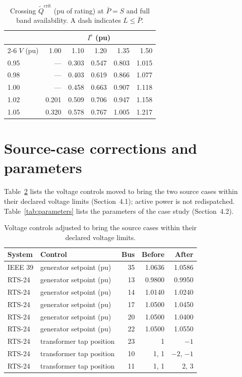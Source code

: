 \documentclass[11pt,a4paper]{article}
\begin{document}
\begin{table}[h]
  \caption{Crossing $\tilde{Q}^{\mathrm{crit}}$ (pu of rating) at
  $\bar{P} = S$ and full band availability. A dash indicates
  $L \le \bar{P}$.}
  \label{tab:critical}
  \centering
  \begin{tabular}{@{}l rrrrr@{}}
    \toprule
    & \multicolumn{5}{c}{$I^{\mathrm{s}}$ (pu)} \\
    \cmidrule(l){2-6}
    $V$ (pu) & 1.00 & 1.10 & 1.20 & 1.35 & 1.50 \\
    \midrule
    0.95 & --- & 0.303 & 0.547 & 0.803 & 1.015 \\
    0.98 & --- & 0.403 & 0.619 & 0.866 & 1.077 \\
    1.00 & --- & 0.458 & 0.663 & 0.907 & 1.118 \\
    1.02 & 0.201 & 0.509 & 0.706 & 0.947 & 1.158 \\
    1.05 & 0.320 & 0.578 & 0.767 & 1.005 & 1.217 \\
    \bottomrule
  \end{tabular}
\end{table}

\section{Source-case corrections and parameters}
\label{s:setup}

Table~\ref{tab:repair} lists the voltage controls moved to bring the two
source cases within their declared voltage limits (Section~4.1); active power
is not redispatched. Table~\ref{tab:parameters} lists the parameters of the
case study (Section~4.2).

\begin{table}[h]
  \caption{Voltage controls adjusted to bring the source cases within their
  declared voltage limits.}
  \label{tab:repair}
  \centering
  \begin{tabular}{@{}llrrr@{}}
    \toprule
    System & Control & Bus & Before & After \\
    \midrule
    IEEE 39 & generator setpoint (pu) & 35 & 1.0636 & 1.0586 \\
    RTS-24 & generator setpoint (pu) & 13 & 0.9800 & 0.9950 \\
    RTS-24 & generator setpoint (pu) & 14 & 1.0140 & 1.0240 \\
    RTS-24 & generator setpoint (pu) & 17 & 1.0500 & 1.0450 \\
    RTS-24 & generator setpoint (pu) & 20 & 1.0500 & 1.0400 \\
    RTS-24 & generator setpoint (pu) & 22 & 1.0500 & 1.0550 \\
    RTS-24 & transformer tap position & 23 & 1 & $-1$ \\
    RTS-24 & transformer tap position & 10 & 1, 1 & $-2$, $-1$ \\
    RTS-24 & transformer tap position & 11 & 1, 1 & 2, 3 \\
    \bottomrule
  \end{tabular}
\end{table}
\end{document}
